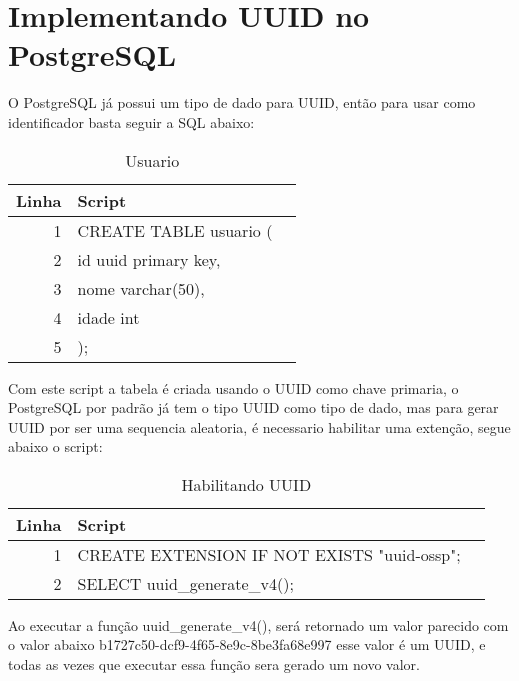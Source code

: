 \section{Implementando UUID no PostgreSQL}
O PostgreSQL já possui um tipo de dado para UUID, então para usar como identificador basta seguir a SQL abaixo:

\begin{table}[h]
\centering
\caption{Usuario}
\vspace{0.5cm}
\begin{tabular}{r|lr}
 
Linha & Script \\ %
\hline                               %
1 & CREATE TABLE usuario (\\
2 & \hspace{1cm} id uuid primary key,\\
3 & \hspace{1cm} nome varchar(50), \\
4 & \hspace{1cm} idade int \\
5 & );           %
 
\end{tabular}
\end{table}

Com este script a tabela é criada usando o UUID como chave primaria,
o PostgreSQL por padrão já tem o tipo UUID como tipo de dado, mas 
para gerar UUID por ser uma sequencia aleatoria, é necessario habilitar uma extenção,
segue abaixo o script:

\begin{table}[h]
\centering
\caption{Habilitando UUID}
\vspace{0.5cm}
\begin{tabular}{r|lr}
 
Linha & Script \\ %
\hline                               %
1 & CREATE EXTENSION IF NOT EXISTS "uuid-ossp";\\
2 & SELECT uuid\_generate\_v4();
 
\end{tabular}
\end{table}

Ao executar a função uuid\_generate\_v4(), será retornado um valor parecido com o valor abaixo
b1727c50-dcf9-4f65-8e9c-8be3fa68e997 esse valor é um UUID, e todas as vezes que executar essa função sera gerado um novo valor.

 
 